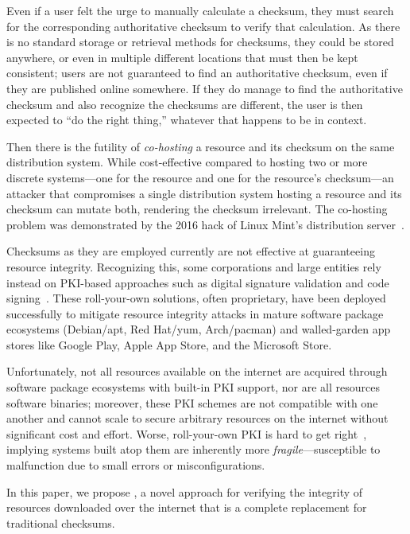 Even if a user felt the urge to manually calculate a checksum, they must search
for the corresponding authoritative checksum to verify that calculation. As
there is no standard storage or retrieval methods for checksums, they could be
stored anywhere, or even in multiple different locations that must then be kept
consistent; users are not guaranteed to find an authoritative checksum, even if
they are published online somewhere. If they do manage to find the authoritative
checksum and also recognize the checksums are different, the user is then
expected to ``do the right thing,'' whatever that happens to be in context.

Then there is the futility of \emph{co-hosting} a resource and its checksum on the same
distribution system. While cost-effective compared to hosting two or more
discrete systems---one for the resource and one for the resource's
checksum---an attacker that compromises a single distribution system hosting
a resource and its checksum can mutate both, rendering the checksum
irrelevant. The co-hosting problem was demonstrated by the 2016 hack of Linux Mint's distribution
server~\cite{SCA-MINT1, SCA-MINT2}.

Checksums as they are employed currently are not effective at guaranteeing
resource integrity. Recognizing this, some corporations and large entities rely
instead on PKI-based approaches such as digital signature validation and code
signing~\cite{PKI}. These roll-your-own solutions, often proprietary, have been
deployed successfully to mitigate resource integrity attacks in mature software
package ecosystems (\eg Debian/apt, Red Hat/yum, Arch/pacman) and walled-garden
app stores like Google Play, Apple App Store, and the Microsoft Store.


Unfortunately, not all resources available on the internet are acquired through
software package ecosystems with built-in PKI support, nor are all resources
software binaries; moreover, these PKI schemes are not compatible with one
another and cannot scale to secure arbitrary resources on the internet without
significant cost and effort. Worse, roll-your-own PKI is hard to get
right~\cite{PKI}, implying systems built atop them are inherently more
\emph{fragile}---susceptible to malfunction due to small errors or
misconfigurations.

In this paper, we propose \SYSTEM{}, a novel approach for verifying the
integrity of resources downloaded over the internet that is a complete
replacement for traditional checksums.

